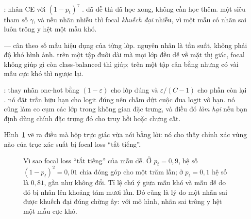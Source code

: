 \documentclass[../../deep_learning.tex]{subfiles}
\begin{document}
\begin{mach}
\item {} \gp {}: nhân CE với \((1-p_t)^\gamma\) \cite{lin2017focal}. \gd đã dễ thì đã học xong, không cần học thêm. \gia một siêu tham số \(\gamma\), và nếu nhãn nhiễu thì focal \emph{khuếch đại} nhiễu, vì một mẫu có nhãn sai luôn trông y hệt một mẫu khó.
\item {} \gp {} --- cân theo số mẫu hiệu dụng của từng lớp. \gd nguyên nhân là tần suất, không phải độ khó hình ảnh. \hq trên một tập đuôi dài mà mọi lớp đều dễ về mặt thị giác, focal không giúp gì còn class-balanced thì giúp; trên một tập cân bằng nhưng có vài mẫu cực khó thì ngược lại.
\item {} \gp {}: thay nhãn one-hot bằng \((1-\varepsilon)\) cho lớp đúng và \(\varepsilon/(C-1)\) cho phần còn lại \cite{szegedy2016rethinking}. \hq nó đặt trần hữu hạn cho logit đúng nên chấm dứt cuộc đua logit vô hạn. \gia nó cũng làm co cụm các lớp trong không gian đặc trưng, và điều đó \emph{làm hại} nếu bạn định dùng chính đặc trưng đó cho truy hồi hoặc chưng cất.
\end{mach}

Hình~\ref{fig:ban-do-doc} vẽ ra điều mà hộp trực giác vừa nói bằng lời: nó cho thấy chính xác vùng nào của trục xác suất bị focal loss ``tắt tiếng''.

\begin{figure}[H]\centering
{}
\caption{Vì sao focal loss ``tắt tiếng'' của mẫu dễ. Ở \(p_t = 0{,}9\), hệ số \((1-p_t)^2 = 0{,}01\) chia đóng góp cho một trăm lần; ở \(p_t = 0{,}1\) hệ số là \(0{,}81\), gần như không đổi. Tỉ lệ chú ý giữa mẫu khó và mẫu dễ do đó bị nhân lên khoảng tám mươi lần. Đó cũng là lý do một nhãn sai được khuếch đại đúng chừng ấy: với mô hình, nhãn sai trông y hệt một mẫu cực khó.}
\label{fig:ban-do-doc}
\end{figure}
\end{document}
